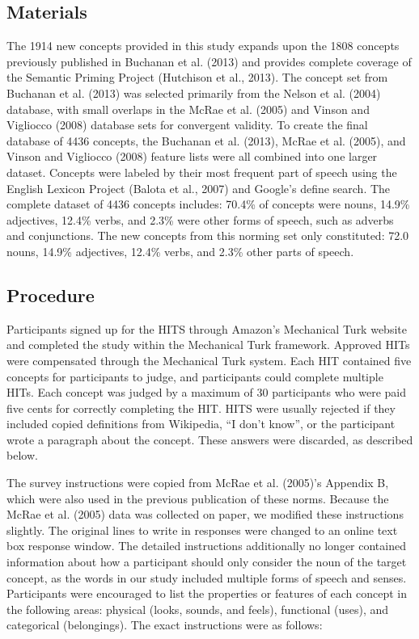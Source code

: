 \documentclass[english,,man]{apa6}
\begin{document}
\hypertarget{materials}{%
\subsection{Materials}\label{materials}}

The 1914 new concepts provided in this study expands upon the 1808 concepts previously published in Buchanan et al. (2013) and provides complete coverage of the Semantic Priming Project (Hutchison et al., 2013). The concept set from Buchanan et al. (2013) was selected primarily from the Nelson et al. (2004) database, with small overlaps in the McRae et al. (2005) and Vinson and Vigliocco (2008) database sets for convergent validity. To create the final database of 4436 concepts, the Buchanan et al. (2013), McRae et al. (2005), and Vinson and Vigliocco (2008) feature lists were all combined into one larger dataset. Concepts were labeled by their most frequent part of speech using the English Lexicon Project (Balota et al., 2007) and Google's define search. The complete dataset of 4436 concepts includes: 70.4\% of concepts were nouns, 14.9\% adjectives, 12.4\% verbs, and 2.3\% were other forms of speech, such as adverbs and conjunctions. The new concepts from this norming set only constituted: 72.0 nouns, 14.9\% adjectives, 12.4\% verbs, and 2.3\% other parts of speech.

\hypertarget{procedure}{%
\subsection{Procedure}\label{procedure}}

Participants signed up for the HITS through Amazon's Mechanical Turk website and completed the study within the Mechanical Turk framework. Approved HITs were compensated through the Mechanical Turk system. Each HIT contained five concepts for participants to judge, and participants could complete multiple HITs. Each concept was judged by a maximum of 30 participants who were paid five cents for correctly completing the HIT. HITS were usually rejected if they included copied definitions from Wikipedia, \enquote{I don't know}, or the participant wrote a paragraph about the concept. These answers were discarded, as described below.

The survey instructions were copied from McRae et al. (2005)'s Appendix B, which were also used in the previous publication of these norms. Because the McRae et al. (2005) data was collected on paper, we modified these instructions slightly. The original lines to write in responses were changed to an online text box response window. The detailed instructions additionally no longer contained information about how a participant should only consider the noun of the target concept, as the words in our study included multiple forms of speech and senses. Participants were encouraged to list the properties or features of each concept in the following areas: physical (looks, sounds, and feels), functional (uses), and categorical (belongings). The exact instructions were as follows:
\end{document}
